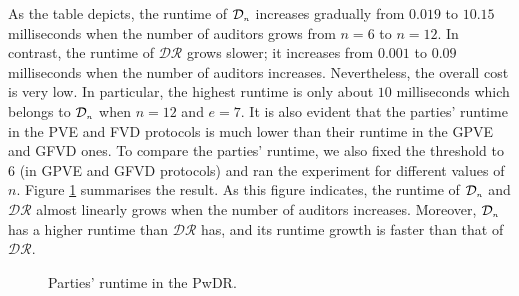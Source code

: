 As the  table depicts, the runtime of $\mathcal{D}_{\scriptscriptstyle n}$    increases gradually from $0.019$ to $10.15$ milliseconds when the number of auditors grows from $n=6$ to $n=12$.  In contrast, the runtime of $\mathcal{DR}$ grows slower; it increases from  $0.001$ to $0.09$ milliseconds when the number of auditors increases. Nevertheless, the overall cost is very low. In particular, the highest runtime is only about $10$ milliseconds which belongs to $\mathcal{D}_{\scriptscriptstyle n}$ when $n=12$ and $e=7$. It is also evident that the parties' runtime in the PVE and FVD protocols is much lower than their runtime in the GPVE and GFVD ones. To compare the  parties' runtime, we also fixed the threshold to $6$ (in GPVE and GFVD protocols) and ran the experiment for different values of $n$. Figure  \ref{plot::runtime} summarises the result. As this figure indicates, the  runtime of  $\mathcal{D}_{\scriptscriptstyle n}$ and $\mathcal{DR}$ almost linearly grows when the number of auditors increases. Moreover,   $\mathcal{D}_{\scriptscriptstyle n}$  has a higher  runtime than $\mathcal{DR}$ has,   and its runtime growth is faster than that of $\mathcal{DR}$. 
%
\begin{figure}[H]
\centering
{}
\vspace{-3mm}
\caption{\small Parties' runtime in the PwDR.}\label{plot::runtime}
\vspace{-3mm}
\end{figure}










